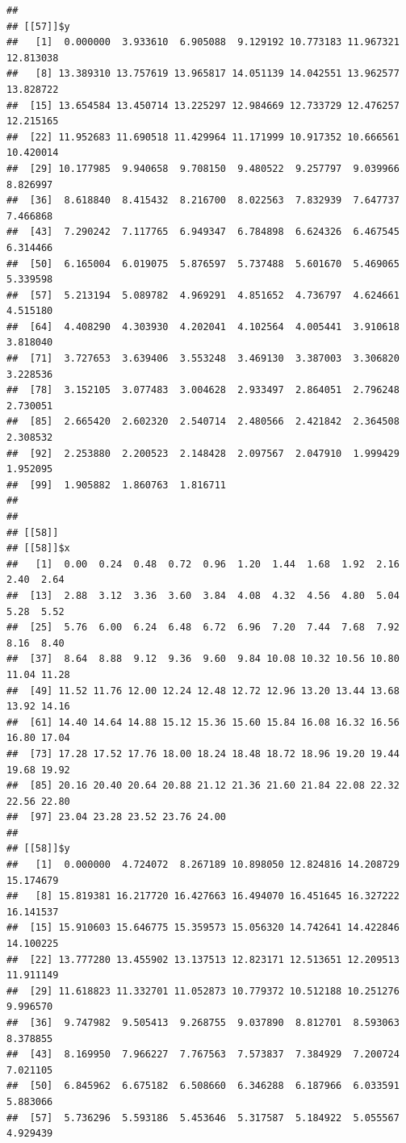 \documentclass[
  ignorenonframetext,
]{beamer}
\begin{document}
\begin{frame}[fragile]{}
\begin{verbatim}
## 
## [[57]]$y
##   [1]  0.000000  3.933610  6.905088  9.129192 10.773183 11.967321 12.813038
##   [8] 13.389310 13.757619 13.965817 14.051139 14.042551 13.962577 13.828722
##  [15] 13.654584 13.450714 13.225297 12.984669 12.733729 12.476257 12.215165
##  [22] 11.952683 11.690518 11.429964 11.171999 10.917352 10.666561 10.420014
##  [29] 10.177985  9.940658  9.708150  9.480522  9.257797  9.039966  8.826997
##  [36]  8.618840  8.415432  8.216700  8.022563  7.832939  7.647737  7.466868
##  [43]  7.290242  7.117765  6.949347  6.784898  6.624326  6.467545  6.314466
##  [50]  6.165004  6.019075  5.876597  5.737488  5.601670  5.469065  5.339598
##  [57]  5.213194  5.089782  4.969291  4.851652  4.736797  4.624661  4.515180
##  [64]  4.408290  4.303930  4.202041  4.102564  4.005441  3.910618  3.818040
##  [71]  3.727653  3.639406  3.553248  3.469130  3.387003  3.306820  3.228536
##  [78]  3.152105  3.077483  3.004628  2.933497  2.864051  2.796248  2.730051
##  [85]  2.665420  2.602320  2.540714  2.480566  2.421842  2.364508  2.308532
##  [92]  2.253880  2.200523  2.148428  2.097567  2.047910  1.999429  1.952095
##  [99]  1.905882  1.860763  1.816711
## 
## 
## [[58]]
## [[58]]$x
##   [1]  0.00  0.24  0.48  0.72  0.96  1.20  1.44  1.68  1.92  2.16  2.40  2.64
##  [13]  2.88  3.12  3.36  3.60  3.84  4.08  4.32  4.56  4.80  5.04  5.28  5.52
##  [25]  5.76  6.00  6.24  6.48  6.72  6.96  7.20  7.44  7.68  7.92  8.16  8.40
##  [37]  8.64  8.88  9.12  9.36  9.60  9.84 10.08 10.32 10.56 10.80 11.04 11.28
##  [49] 11.52 11.76 12.00 12.24 12.48 12.72 12.96 13.20 13.44 13.68 13.92 14.16
##  [61] 14.40 14.64 14.88 15.12 15.36 15.60 15.84 16.08 16.32 16.56 16.80 17.04
##  [73] 17.28 17.52 17.76 18.00 18.24 18.48 18.72 18.96 19.20 19.44 19.68 19.92
##  [85] 20.16 20.40 20.64 20.88 21.12 21.36 21.60 21.84 22.08 22.32 22.56 22.80
##  [97] 23.04 23.28 23.52 23.76 24.00
## 
## [[58]]$y
##   [1]  0.000000  4.724072  8.267189 10.898050 12.824816 14.208729 15.174679
##   [8] 15.819381 16.217720 16.427663 16.494070 16.451645 16.327222 16.141537
##  [15] 15.910603 15.646775 15.359573 15.056320 14.742641 14.422846 14.100225
##  [22] 13.777280 13.455902 13.137513 12.823171 12.513651 12.209513 11.911149
##  [29] 11.618823 11.332701 11.052873 10.779372 10.512188 10.251276  9.996570
##  [36]  9.747982  9.505413  9.268755  9.037890  8.812701  8.593063  8.378855
##  [43]  8.169950  7.966227  7.767563  7.573837  7.384929  7.200724  7.021105
##  [50]  6.845962  6.675182  6.508660  6.346288  6.187966  6.033591  5.883066
##  [57]  5.736296  5.593186  5.453646  5.317587  5.184922  5.055567  4.929439

\end{verbatim}
\end{frame}
\end{document}
